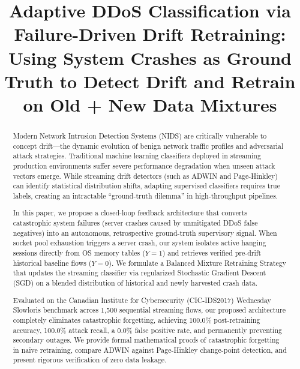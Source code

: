 \documentclass[conference]{IEEEtran}
\begin{document}
\title{Adaptive DDoS Classification via Failure-Driven Drift Retraining: Using System Crashes as Ground Truth to Detect Drift and Retrain on Old + New Data Mixtures}

\author{
\and
{}
\and
{}
}

\maketitle

\begin{abstract}
Modern Network Intrusion Detection Systems (NIDS) are critically vulnerable to concept drift---the dynamic evolution of benign network traffic profiles and adversarial attack strategies. Traditional machine learning classifiers deployed in streaming production environments suffer severe performance degradation when unseen attack vectors emerge. While streaming drift detectors (such as ADWIN and Page-Hinkley) can identify statistical distribution shifts, adapting supervised classifiers requires true labels, creating an intractable ``ground-truth dilemma'' in high-throughput pipelines. 

In this paper, we propose a closed-loop feedback architecture that converts catastrophic system failures (server crashes caused by unmitigated DDoS false negatives) into an autonomous, retrospective ground-truth supervisory signal. When socket pool exhaustion triggers a server crash, our system isolates active hanging sessions directly from OS memory tables ($Y=1$) and retrieves verified pre-drift historical baseline flows ($Y=0$). We formulate a Balanced Mixture Retraining Strategy that updates the streaming classifier via regularized Stochastic Gradient Descent (SGD) on a blended distribution of historical and newly harvested crash data. 

Evaluated on the Canadian Institute for Cybersecurity (CIC-IDS2017) Wednesday Slowloris benchmark across 1,500 sequential streaming flows, our proposed architecture completely eliminates catastrophic forgetting, achieving 100.0\% post-retraining accuracy, 100.0\% attack recall, a 0.0\% false positive rate, and permanently preventing secondary outages. We provide formal mathematical proofs of catastrophic forgetting in naive retraining, compare ADWIN against Page-Hinkley change-point detection, and present rigorous verification of zero data leakage.
\end{abstract}
\end{document}

